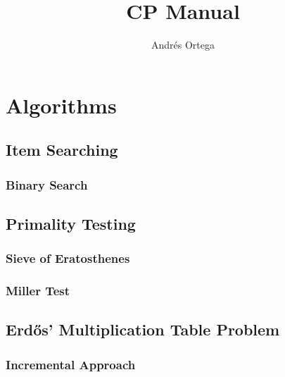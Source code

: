 \documentclass[12pt]{article}
\newcommand{\<}{\langle}
\renewcommand{\>}{\rangle}
\renewcommand{\(}{\left(}
\renewcommand{\)}{\right)}
\begin{document}
\title{CP Manual}
\author{Andrés Ortega}
\date{}

\maketitle

\tableofcontents

\section{Algorithms}
\subsection{Item Searching}
    \subsubsection{Binary Search}
        

\subsection{Primality Testing}
    \subsubsection{Sieve of Eratosthenes}
        

    \subsubsection{Miller Test}
        

\subsection{Erdős' Multiplication Table Problem}
    \subsubsection{Incremental Approach}
        

\printbibliography
\end{document}
